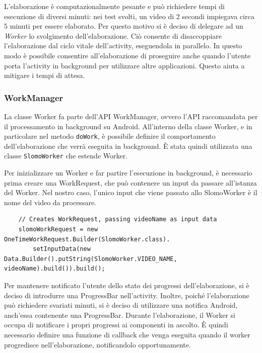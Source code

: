 L'elaborazione è computazionalmente pesante e può richiedere tempi di esecuzione di diversi minuti: nei test svolti,
un video di 2 secondi impiegava circa 5 minuti per essere elaborato.
Per questo motivo si è deciso di delegare ad un \textit{Worker} lo svolgimento dell'elaborazione. Ciò consente di disaccoppiare
l'elaborazione dal ciclo vitale dell'activity, eseguendola in parallelo. In questo modo è possibile consentire
all'elaborazione di proseguire anche quando l'utente porta l'activity in background per utilizzare altre applicazioni.
Questo aiuta a mitigare i tempi di attesa.

\subsubsection*{WorkManager}

La classe Worker fa parte dell'API WorkManager, ovvero l'API raccomandata per il processamento in background su Android.
All'interno della classe Worker, e in particolare nel metodo \texttt{doWork}, è possibile definire il comportamento 
dell'elaborazione che verrà eseguita in background. È stata quindi utilizzata una classe \texttt{SlomoWorker} che estende
Worker.

Per inizializzare un Worker e far partire l'esecuzione in background, è necessario prima creare una WorkRequest,
che può contenere un input da passare all'istanza del Worker. Nel nostro caso, l'unico input che viene passato allo
SlomoWorker è il nome del video da processare.

\begin{lstlisting}
    // Creates WorkRequest, passing videoName as input data
    slomoWorkRequest = new OneTimeWorkRequest.Builder(SlomoWorker.class).
        setInputData(new Data.Builder().putString(SlomoWorker.VIDEO_NAME, videoName).build()).build();
\end{lstlisting}

Per mantenere notificato l'utente dello stato dei progressi dell'elaborazione, si è deciso di introdurre una ProgressBar 
nell'activity. Inoltre, poiché l'elaborazione può richiedere svariati minuti, si è deciso di utilizzare una notifica
Android, anch'essa contenente una ProgressBar. Durante l'elaborazione, il Worker si occupa di notificare i propri progressi
ai componenti in ascolto. È quindi necessario definire una funzione di callback che venga eseguita quando il worker progredisce
nell'elaborazione, notificandolo opportunamente.


